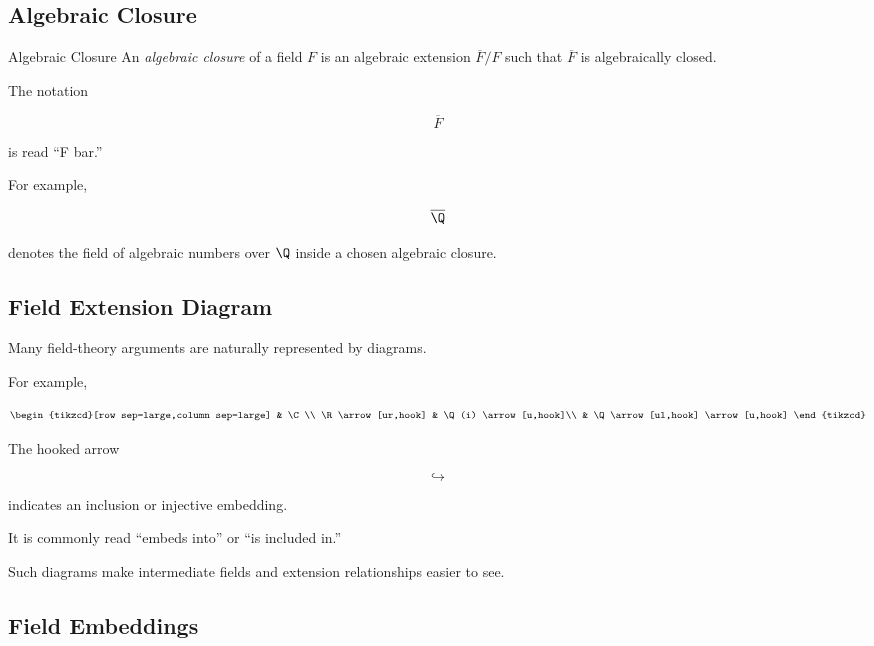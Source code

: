 \subsection{Algebraic Closure}
\label{subsec:algebraic-closure}

\begin{definitionbox}{Algebraic Closure}
An \emph{algebraic closure} of a field \(F\) is an algebraic extension
\(\overline{F}/F\) such that \(\overline{F}\) is algebraically closed.
\end{definitionbox}

The notation

\[ \overline{F} \]

is read ``F bar.''

For example,

\[ \overline{\Q} \]

denotes the field of algebraic numbers over \(\Q\) inside a chosen algebraic
closure.

\subsection{Field Extension Diagram}
\label{subsec:field-extension-diagram}

Many field-theory arguments are naturally represented by diagrams.

For example,

\[
\begin{tikzcd}[row sep=large,column sep=large]
& \C \\
\R \arrow[ur,hook] & \Q(i) \arrow[u,hook]\\
& \Q \arrow[ul,hook] \arrow[u,hook]
\end{tikzcd}
\]

The hooked arrow

\[ \hookrightarrow \]

indicates an inclusion or injective embedding.

It is commonly read ``embeds into'' or ``is included in.''

Such diagrams make intermediate fields and extension relationships easier to
see.

\subsection{Field Embeddings}
\label{subsec:field-embeddings}

